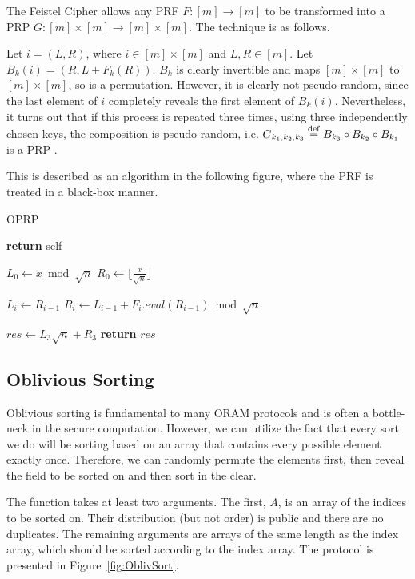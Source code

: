 The Feistel Cipher allows any PRF $F : [m] \rightarrow[m]$ to be transformed
into a PRP $G : [m] \times [m] \rightarrow [m] \times [m]$. The technique is as follows.

Let $i = (L, R)$, where $i \in [m] \times [m]$ and $L, R \in [m]$.
Let $B_k(i) = (R, L + F_k(R))$.
$B_k$ is clearly invertible and maps $[m] \times [m]$ to $[m] \times [m]$, 
so is a permutation.
However, it is clearly not pseudo-random, since the last element of $i$ 
completely reveals the first element of $B_k(i)$.
Nevertheless, it turns out that if this process is repeated three times,
using three independently chosen keys, the composition is pseudo-random,
i.e. $G_{k_1, k_2, k_3} \stackrel{\mathrm{def}}{=} B_{k_3} \circ B_{k_2} \circ B_{k_1}$ is a PRP
\cite{luby1988construct}.

This is described as an algorithm in the following figure,
where the PRF is treated in a black-box manner.

\begin{algorithm}
\caption{OPRP}
\label{alg:oprp}
\begin{algorithmic}[1]

\State \textbf{return} self   
\EndProcedure

\State $L_0 \gets x \bmod \sqrt{n}$
\State $R_0 \gets \lfloor \frac{x}{\sqrt{n}} \rfloor$

\State $L_i \gets R_{i-1}$
\State $R_i \gets L_{i-1} + F_{i}.eval(R_{i-1}) \bmod \sqrt{n}$
\EndFor

\State $res \gets L_3\sqrt{n} + R_3$
\State \textbf{return} $res$
\EndProcedure

\end{algorithmic}
\end{algorithm}
\subsection{Oblivious Sorting}

Oblivious sorting is fundamental to many ORAM protocols and is often
a bottle-neck in the secure computation.
However, we can utilize the fact that every sort we do will be sorting
based on an array that contains every possible element exactly once.
Therefore, we can randomly permute the elements first,
then reveal the field to be sorted on and then sort in the clear.

The function takes at least two arguments. 
The first, $A$, is an array of the indices to be sorted on.
Their distribution (but not order) is public and there are no duplicates.
The remaining arguments are arrays of the same length as the index array,
which should be sorted according to the index array.
The protocol is presented in Figure~\ref{fig:OblivSort}.


